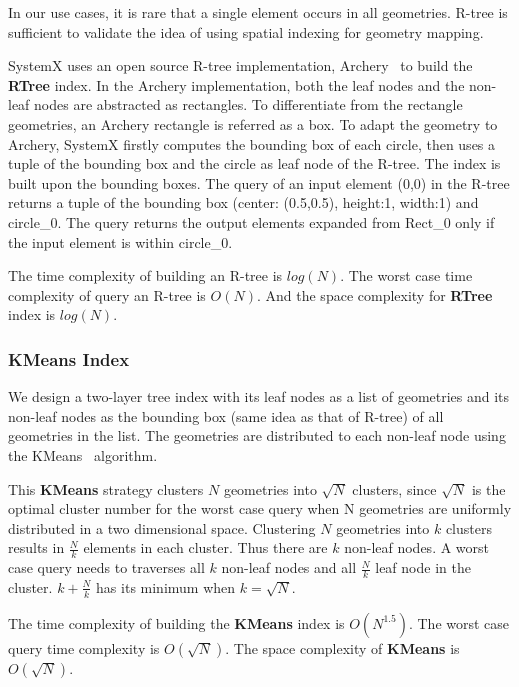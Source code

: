 \documentclass{sig-alternate}
\begin{document}
In our use cases, it is rare that a single element occurs in all geometries.  
R-tree is sufficient to validate the idea of using spatial indexing for geometry mapping.

SystemX uses an open source R-tree implementation, Archery~\cite{osheim13} to build the {\bf RTree} index.
In the Archery implementation, both the leaf nodes and the non-leaf nodes are abstracted as rectangles.
To differentiate from the rectangle geometries, an Archery rectangle is referred as a box.
To adapt the geometry to Archery, SystemX firstly computes the bounding box of each circle, then uses
a tuple of the bounding box and the circle as leaf node of the R-tree. 
The index is built upon the bounding boxes. 
The query of an input element (0,0) in the R-tree returns a tuple of the bounding box (center: (0.5,0.5), height:1, width:1) and circle\_0.
The query returns the output elements expanded from Rect\_0 only if the input element is within circle\_0.

The time complexity of building an R-tree is $log(N)$.
The worst case time complexity of query an R-tree is $O(N)$.
And the space complexity for {\bf RTree} index is $log(N)$.

\subsubsection{KMeans Index}
We design a two-layer tree index with its leaf nodes as a list of geometries and its non-leaf nodes as the bounding box (same idea as that of R-tree)
of all geometries in the list.
The geometries are distributed to each non-leaf node using the KMeans~\cite{macqueen67} algorithm.

This {\bf KMeans} strategy clusters $N$ geometries into $\sqrt{N}$ clusters, 
since $\sqrt{N}$ is the optimal cluster number for the worst case query when N geometries are uniformly distributed in a two dimensional space.
Clustering $N$ geometries into $k$ clusters results in $\frac{N}{k}$ elements in each cluster. 
Thus there are $k$ non-leaf nodes.
A worst case query needs to traverses all $k$ non-leaf nodes and all $\frac{N}{k}$ leaf node in the cluster.
$k+\frac{N}{k}$ has its minimum when $k=\sqrt{N}$. 

The time complexity of building the {\bf KMeans} index is $O(N^{1.5})$.
The worst case query time complexity is $O(\sqrt{N})$.
The space complexity of {\bf KMeans} is $O(\sqrt{N})$.
\end{document}
